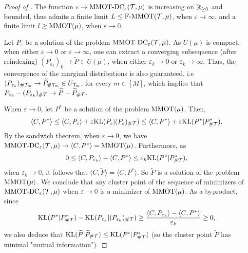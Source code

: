 \begin{proof}[Proof of ]
The function $\varepsilon \to \text{MMOT-DC}_{\varepsilon}(\mathcal T, \mu)$ is increasing on $\mathbb R_{\geq 0}$ and bounded,
thus admits a finite limit $L \leq \text{F-MMOT}(\mathcal T, \mu)$, when $\varepsilon \to \infty$, and a finite limit
$l \geq \text{MMOT}(\mu)$, when $\varepsilon \to 0$.

Let $P_{\varepsilon}$ be a solution of the problem $\text{MMOT-DC}_{\varepsilon}(\mathcal T, \mu)$.
As $U(\mu)$ is compact, when either $\varepsilon \to 0$ or $\varepsilon \to \infty$,
one can extract a converging subsequence (after reindexing)
$(P_{\varepsilon_k})_k \to \widetilde{P} \in U(\mu)$,
when either $\varepsilon_k \to 0$ or $\varepsilon_k \to \infty$.
Thus, the convergence of the marginal distributions is also guaranteed, i.e
$(P_{\varepsilon_k})_{\# \mathcal T_m} \to \widetilde{P}_{\# \mathcal T_m} \in U_{\mathcal T_m}$, for every $m \in [M]$,
which implies that $P_{\varepsilon_k} - (P_{\varepsilon_k})_{\# \mathcal T} \to \widetilde{P} - \widetilde{P}_{\# \mathcal T}$.

When $\varepsilon \to 0$, let $P^{*}$ be a solution of the problem $\text{MMOT}(\mu)$. Then,
\begin{equation}
  \langle C, P^* \rangle \leq \langle C, P_{\varepsilon} \rangle +
  \varepsilon \text{KL}(P_{\varepsilon} \vert (P_{\varepsilon})_{\# \mathcal T}) \leq
  \langle C, P^* \rangle + \varepsilon \text{KL}(P^* \vert P^*_{\# \mathcal T}).
\end{equation}
By the sandwich theorem, when $\varepsilon \to 0$, we have
$\text{MMOT-DC}_{\varepsilon}(\mathcal T, \mu) \to \langle C, P^* \rangle = \text{MMOT}(\mu)$.
Furthermore, as
\begin{equation}
  0 \leq \langle C, P_{\varepsilon_k} \rangle - \langle C, P^* \rangle
  \leq \varepsilon_k \text{KL}(P^* \vert P^*_{\# \mathcal T}),
\end{equation}
when $\varepsilon_k \to 0$, it follows that $\langle C, \widetilde{P} \rangle = \langle C, P^* \rangle$.
So $\widetilde{P}$ is a solution of the problem $\text{MMOT}(\mu)$. We conclude that
any cluster point of the sequence of minimizers of $\text{MMOT-DC}_{\varepsilon}(\mathcal T, \mu)$ when
$\varepsilon \to 0$ is a minimizer of $\text{MMOT}(\mu)$. As a byproduct, since
\begin{equation}
  \text{KL}(P^* \vert P^*_{\# \mathcal T}) - \text{KL}(P_{\varepsilon_k} \vert (P_{\varepsilon_k})_{\# \mathcal T}) \geq
  \frac{\langle C, P_{\varepsilon_k} \rangle - \langle C, P^* \rangle}{\varepsilon_k} \geq 0,
\end{equation}
we also deduce that $\text{KL}(\widetilde{P} \vert \widetilde{P}_{\# \mathcal T}) \leq \text{KL}(P^* \vert P^*_{\# \mathcal T})$
(so the cluster point $\widetilde{P}$ has minimal "mutual information").


\end{proof}
